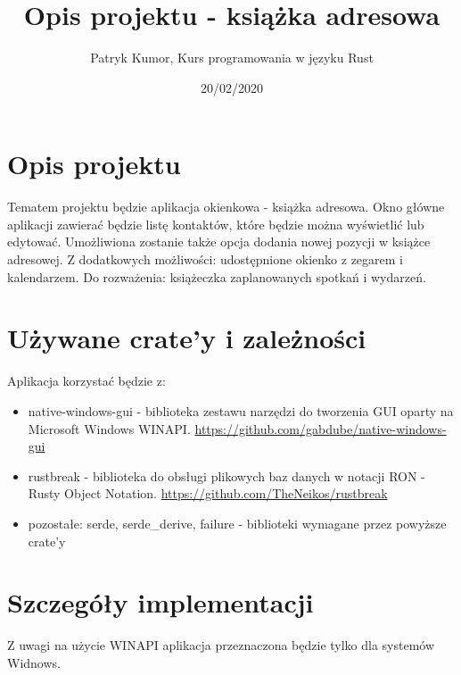 \documentclass[11pt]{article}
\title{Opis projektu - ksi\k{a}\.zka adresowa}
\author{Patryk Kumor, Kurs programowania w j\k{e}zyku Rust}
\date{20/02/2020}
\begin{document}
\maketitle

\section{Opis projektu}
Tematem projektu b\k{e}dzie aplikacja okienkowa - ksi\k{a}\.zka adresowa.
Okno g\l{}\'owne aplikacji zawiera\'c b\k{e}dzie list\k{e} kontakt\'ow, kt\'ore b\k{e}dzie mo\.zna
wy\'swietli\'c lub edytowa\'c. Umo\.zliwiona zostanie tak\.ze opcja dodania nowej pozycji w\,\,ksi\k{a}\.zce adresowej. 
\newline
Z dodatkowych mo\.zliwo\'sci: udost\k{e}pnione okienko z zegarem i kalendarzem.
\newline
Do rozwa\.zenia: ksi\k{a}\.zeczka zaplanowanych spotka\'n i wydarze\'n.


\section{U\.zywane crate'y i zale\.zno\'sci}
Aplikacja korzysta\'c b\k{e}dzie z:
\begin{itemize}
    \item
    native-windows-gui - biblioteka zestawu narz\k{e}dzi do tworzenia GUI oparty na Microsoft Windows WINAPI. \newline
    \url{ https://github.com/gabdube/native-windows-gui }
    \item
    rustbreak - biblioteka do obs\l{}ugi plikowych baz danych w notacji RON - Rusty Object Notation. \newline
    \url{ https://github.com/TheNeikos/rustbreak }
    \item 
    pozosta\l{}e: serde, serde\_derive, failure - biblioteki wymagane przez powy\.zsze crate'y 
\end{itemize}

\section{Szczeg\'o\l{}y implementacji}
Z uwagi na u\.zycie WINAPI aplikacja przeznaczona b\k{e}dzie tylko dla system\'ow Widnows.
\end{document}
